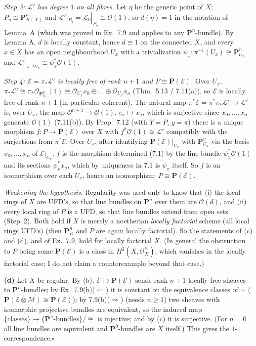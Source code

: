 \documentclass[11pt]{article}
\begin{document}
\emph{Step 3: $\mathcal L'$ has degree $1$ on all fibres.} Let $\eta$ be the generic point of $X$; $P_\eta\cong\mathbf P^n_{K(X)}$ and $\mathcal L'|_{P_\eta}=\mathcal L_0|_{P_\eta}\cong\mathcal O(1)$, so $d(\eta)=1$ in the notation of Lemma~A (which was proved in Ex.~7.9 and applies to any $\mathbf P^n$-bundle). By Lemma A, $d$ is locally constant, hence $d\equiv1$ on the connected $X$, and every $x\in X$ has an open neighbourhood $U_x$ with a trivialization $\psi_x:\pi^{-1}(U_x)\cong\mathbf P^n_{U_x}$ and $\mathcal L'|_{\pi^{-1}U_x}\cong\psi_x^*\mathcal O(1)$.

\emph{Step 4: $\mathcal E=\pi_*\mathcal L'$ is locally free of rank $n+1$ and $P\cong\mathbf P(\mathcal E)$.} Over $U_x$, $\pi_*\mathcal L'\cong\pi_*\mathcal O_{\mathbf P^n_{U_x}}(1)\cong\mathcal O_{U_x}x_0\oplus\dots\oplus\mathcal O_{U_x}x_n$ (Thm.~5.13 / 7.11(a)), so $\mathcal E$ is locally free of rank $n+1$ (in particular coherent). The natural map $\pi^*\mathcal E=\pi^*\pi_*\mathcal L'\to\mathcal L'$ is, over $U_x$, the map $\mathcal O^{n+1}\to\mathcal O(1)$, $e_a\mapsto x_a$, which is surjective since $x_0,\dots,x_n$ generate $\mathcal O(1)$ (7.11(b)). By Prop.~7.12 (with $Y=P$, $g=\pi$) there is a unique morphism $f:P\to\mathbf P(\mathcal E)$ over $X$ with $f^*\mathcal O(1)\cong\mathcal L'$ compatibly with the surjections from $\pi^*\mathcal E$. Over $U_x$, after identifying $\mathbf P(\mathcal E)|_{U_x}$ with $\mathbf P^n_{U_x}$ via the basis $x_0,\dots,x_n$ of $\mathcal E|_{U_x}$, $f$ is the morphism determined (7.1) by the line bundle $\psi_x^*\mathcal O(1)$ and its sections $\psi_x^*x_a$, which by uniqueness in 7.1 is $\psi_x$ itself. So $f$ is an isomorphism over each $U_x$, hence an isomorphism: $P\cong\mathbf P(\mathcal E)$.

\emph{Weakening the hypothesis.} Regularity was used only to know that (i) the local rings of $X$ are UFD's, so that line bundles on $\mathbf P^n$ over them are $\mathcal O(d)$, and (ii) every local ring of $P$ is a UFD, so that line bundles extend from open sets (Step~2). Both hold if $X$ is merely a noetherian \emph{locally factorial} scheme (all local rings UFD's) (then $\mathbf P^n_R$ and $P$ are again locally factorial). So the statements of (c) and (d), and of Ex.~7.9, hold for locally factorial $X$. (In general the obstruction to $P$ being some $\mathbf P(\mathcal E)$ is a class in $H^2(X,\mathcal O_X^*)$, which vanishes in the locally factorial case; I do not claim a counterexample beyond that case.)

\textbf{(d)} Let $X$ be regular. By (b), $\mathcal E\mapsto\mathbf P(\mathcal E)$ sends rank $n+1$ locally free sheaves to $\mathbf P^n$-bundles; by Ex.~7.9(b)($\Leftarrow$) it is constant on the equivalence classes of $\sim$ ($\mathbf P(\mathcal E\otimes\mathcal M)\cong\mathbf P(\mathcal E)$); by 7.9(b)($\Rightarrow$) (needs $n\ge1$) two sheaves with isomorphic projective bundles are equivalent, so the induced map $\{\text{classes}\}\to\{\mathbf P^n\text{-bundles}\}/\cong$ is injective; and by (c) it is surjective. (For $n=0$ all line bundles are equivalent and $\mathbf P^0$-bundles are $X$ itself.) This gives the $1$-$1$ correspondence.\hfill$\square$
\end{document}
